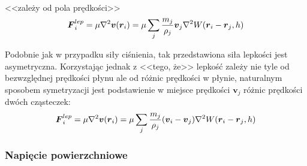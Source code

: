 \paragraph{}
<<zależy od pola prędkości>>
\begin{equation}
\boldsymbol{F}_i^{lep} = \mu \nabla^2 \boldsymbol{v}(\boldsymbol{r}_i) = \mu \sum\limits_{j} {m_j \over \rho_j} \boldsymbol{v}_j \nabla^2 W(\boldsymbol{r}_i-\boldsymbol{r}_j, h)
\label{eqn:sph_force_viscosity_1}
\end{equation}

Podobnie jak w przypadku siły ciśnienia, tak przedstawiona siła lepkości jest asymetryczna. Korzystając jednak z <<tego, że>> lepkość zależy nie tyle od bezwzględnej prędkości płynu ale od różnic prędkości w płynie, naturalnym sposobem symetryzacji jest podstawienie w miejsce prędkości $\boldsymbol{v}_j$ różnic prędkości dwóch cząsteczek:
\begin{equation}
\boldsymbol{F}_i^{lep} = \mu \nabla^2 \boldsymbol{v}(\boldsymbol{r}_i) = \mu \sum\limits_{j} {m_j \over \rho_j} (\boldsymbol{v}_i - \boldsymbol{v}_j) \nabla^2 W(\boldsymbol{r}_i-\boldsymbol{r}_j, h)
\label{eqn:sph_force_viscosity}
\end{equation}
\par

\subsubsection{Napięcie powierzchniowe}

